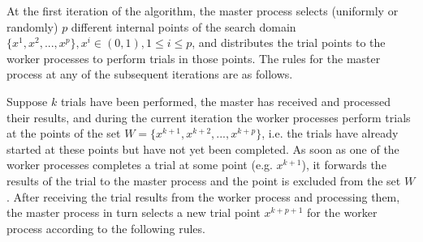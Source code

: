 \documentclass[runningheads]{llncs}
\begin{document}
At the first iteration of the algorithm, the master process selects (uniformly or randomly) $p$ different internal points of the search domain $\{x^1, x^2, ..., x^p\}, x^i \in (0,1), 1 \leq i \leq p$, and distributes the trial points to the worker processes to perform trials in those points. The rules for the master process at any of the subsequent iterations are as follows. 

Suppose $k$ trials have been performed, the master has received and processed their results, and during the current iteration the worker processes perform trials at the points of the set $W=\{x^{k+1}, x^{k+2},..., x^{k+p}\}$, i.e. the trials have already started at these points but have not yet been completed. As soon as one of the worker processes completes a trial at some point (e.g. $x^{k+1}$), it forwards the results of the trial to the master process and the point is excluded from the set $W$. After receiving the trial results from the worker process and processing them, the master process in turn selects a new trial point $x^{k+p+1}$ for the worker process according to the following rules.
\end{document}
